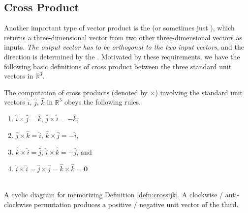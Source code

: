 \subsection{Cross Product}
\label{section:crossprod}
Another important type of vector product is the  (or sometimes just ), which returns a three-dimensional vector from two other three-dimensional vectors as inputs. \textit{The output vector has to be orthogonal to the two input vectors}, and the direction is determined by the . Motivated by these requirements, we have the following basic definitions of cross product between the three standard unit vectors in $\mathbb{R}^3$.
\begin{defn}
\label{defn:crossijk}
The computation of cross products (denoted by $\times$) involving the standard unit vectors $\hat{i}$, $\hat{j}$, $\hat{k}$ in $\mathbb{R}^3$ obeys the following rules.
\begin{enumerate}
\item $\hat{i} \times \hat{j} = \hat{k}$, $\hat{j} \times \hat{i} = -\hat{k}$,
\item $\hat{j} \times \hat{k} = \hat{i}$, $\hat{k} \times \hat{j} = -\hat{i}$,
\item $\hat{k} \times \hat{i} = \hat{j}$, $\hat{i} \times \hat{k} = -\hat{j}$, and
\item $\hat{i} \times \hat{i} = \hat{j} \times \hat{j} = \hat{k} \times \hat{k} = \textbf{0}$
\end{enumerate}
\end{defn}
\begin{minipage}{0.45\textwidth}
\begin{center}
 \\
A cyclic diagram for memorizing Definition \ref{defn:crossijk}. A clockwise / anti-clockwise permutation produces a positive / negative unit vector of the third.
\end{center}
\end{minipage}
